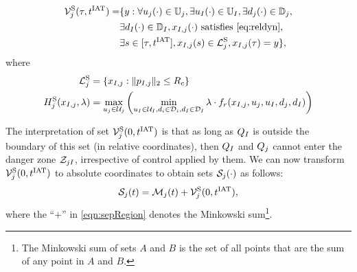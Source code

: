 \begin{equation} \label{eqn:optAvoid}
\begin{aligned}
\brs^{\text{S}}_{j}(\tau, \iat) = & \{y: \forall \ctrl_j(\cdot) \in \cfset_j, \exists \ctrl_\intr(\cdot) \in \cfset_\intr, \exists \dstb_j(\cdot) \in \dfset_j, \\
& \exists \dstb_\intr(\cdot) \in \dfset_\intr, \state_{\intr, j}(\cdot) \text{ satisfies \eqref{eq:reldyn}},\\
& \exists s \in [\tau, \iat], \state_{\intr, j}(s) \in \targetset^{\text{S}}_{j}, \state_{\intr, j}(\tau) = y\},
\end{aligned}
\end{equation}
where 
\begin{equation}
\begin{aligned}
\mathcal{L}^{\text{S}}_{j} &= \{x_{I, j}: \|p_{I, j}\|_2 \le R_c\} \\
H^{\text{S}}_{j}(x_{I, j}, \lambda) &= \max_{u_j \in \mathcal{U}_j} \left( \min_{u_I \in \mathcal{U}_I, d_i \in \mathcal{D}_i, d_I \in \mathcal{D}_I} \lambda \cdot f_r(x_{I, j}, u_j, u_I, d_j, d_I) \right)
\end{aligned}
\end{equation}

The interpretation of set $\mathcal{V}^{\text{S}}_{j}(0, t^\text{IAT})$ is that as long as $Q_{I}$ is outside the boundary of this set (in relative coordinates), then $Q_{I}$ and $Q_{j}$ cannot enter the danger zone $\mathcal{Z}_{jI}$, irrespective of control applied by them. We can now transform $\mathcal{V}^{\text{S}}_{j}(0, t^\text{IAT})$ to absolute coordinates to obtain sets $\mathcal{S}_j(\cdot)$ as follows:
\begin{equation} \label{eqn:sepRegion}
\sep_j(t) = \boset_j(t) + \brs^{\text{S}}_{j}(0, \iat),
\end{equation}
where the ``$+$'' in \eqref{eqn:sepRegion} denotes the Minkowski sum\footnote{The Minkowski sum of sets $A$ and $B$ is the set of all points that are the sum of any point in $A$ and $B$.}.
